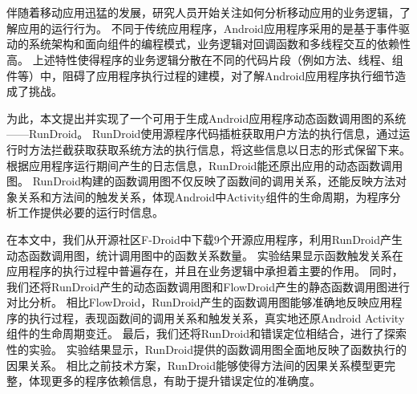 
\chapter*{}


\setlength{\baselineskip}{25pt}	



伴随着移动应用迅猛的发展，研究人员开始关注如何分析移动应用的业务逻辑，了解应用的运行行为。
不同于传统应用程序，Android应用程序采用的是基于事件驱动的系统架构和面向组件的编程模式，业务逻辑对回调函数和多线程交互的依赖性高。
上述特性使得程序的业务逻辑分散在不同的代码片段（例如方法、线程、组件等）中，阻碍了应用程序执行过程的建模，对了解Android应用程序执行细节造成了挑战。



为此，本文提出并实现了一个可用于生成Android应用程序动态函数调用图的系统——RunDroid。
RunDroid使用源程序代码插桩获取用户方法的执行信息，通过运行时方法拦截获取获取系统方法的执行信息，将这些信息以日志的形式保留下来。
根据应用程序运行期间产生的日志信息，RunDroid能还原出应用的动态函数调用图。
RunDroid构建的函数调用图不仅反映了函数间的调用关系，还能反映方法对象关系和方法间的触发关系，体现Android中Activity组件的生命周期，为程序分析工作提供必要的运行时信息。




在本文中，我们从开源社区F-Droid中下载9个开源应用程序，利用RunDroid产生动态函数调用图，统计调用图中的函数关系数量。
实验结果显示函数触发关系在应用程序的执行过程中普遍存在，并且在业务逻辑中承担着主要的作用。
同时，我们还将RunDroid产生的动态函数调用图和FlowDroid产生的静态函数调用图进行对比分析。
相比FlowDroid，RunDroid产生的函数调用图能够准确地反映应用程序的执行过程，表现函数间的调用关系和触发关系，真实地还原Android Activity组件的生命周期变迁。
最后，我们还将RunDroid和错误定位相结合，进行了探索性的实验。
实验结果显示，RunDroid提供的函数调用图全面地反映了函数执行的因果关系。
相比之前技术方案，RunDroid能够使得方法间的因果关系模型更完整，体现更多的程序依赖信息，有助于提升错误定位的准确度。




\hspace{-0.5cm}
 
